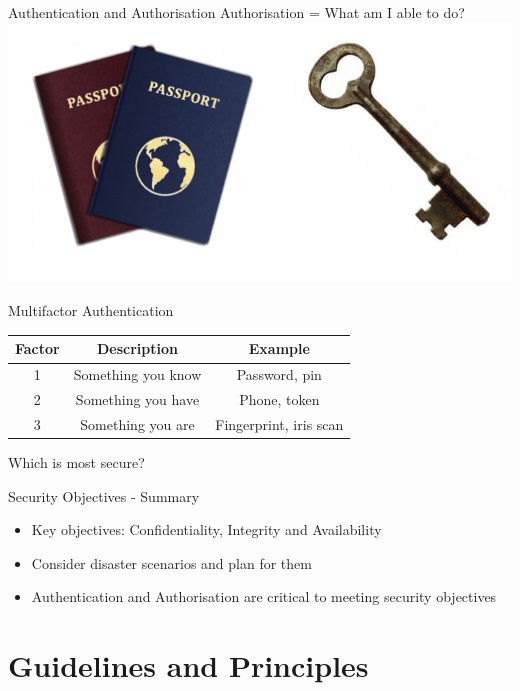 \documentclass{beamer}
\begin{document}
\begin{frame}{Authentication and Authorisation}
Authorisation = What am I able to do?
\includegraphics[width=1\linewidth]{authn-authz.png}
\end{frame}
\begin{frame}{Multifactor Authentication}
\begin{center}
\begin{tabular}{ |c|c|c| }
\hline
 \textbf{Factor} & \textbf{Description} & \textbf{Example}\\
\hline \hline
 1 & Something you know & Password, pin\\ \hline
 2 & Something you have & Phone,  token \\  \hline
 3 & Something you are & Fingerprint, iris scan \\ \hline
\end{tabular}
\end{center}
Which is most secure?
\end{frame}

\begin{frame}{Security Objectives - Summary}
\begin{itemize}
\item Key objectives: Confidentiality, Integrity and Availability
\item Consider disaster scenarios and plan for them 
\item Authentication and Authorisation are critical to meeting security objectives
\end{itemize}
\end{frame}

\section{Guidelines and Principles}
\frame{\sectionpage}
\end{document}
